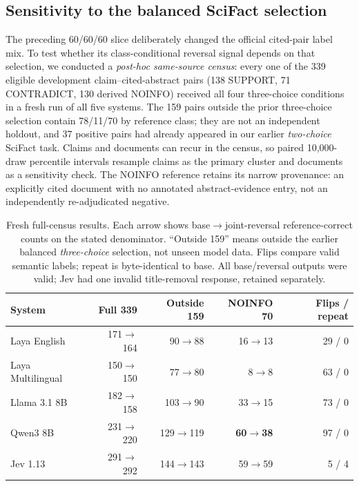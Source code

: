 \subsection{Sensitivity to the balanced SciFact selection}
\label{sec:scifact3-census}
The preceding 60/60/60 slice deliberately changed the official cited-pair label mix. To test whether its class-conditional reversal signal depends on that selection, we conducted a \emph{post-hoc same-source census}: every one of the 339 eligible development claim--cited-abstract pairs (138 SUPPORT, 71 CONTRADICT, 130 derived NOINFO) received all four three-choice conditions in a fresh run of all five systems. The 159 pairs outside the prior three-choice selection contain 78/11/70 by reference class; they are not an independent holdout, and 37 positive pairs had already appeared in our earlier \emph{two-choice} SciFact task. Claims and documents can recur in the census, so paired 10,000-draw percentile intervals resample claims as the primary cluster and documents as a sensitivity check. The NOINFO reference retains its narrow provenance: an explicitly cited document with no annotated abstract-evidence entry, not an independently re-adjudicated negative.

\begin{table}[H]
\centering\small
\setlength{\tabcolsep}{4pt}
\begin{tabular}{lrrrr}
\toprule
System & Full 339 & Outside 159 & NOINFO 70 & Flips / repeat \\
\midrule
Laya English & 171$\to$164 & 90$\to$88 & 16$\to$13 & 29 / 0 \\
Laya Multilingual & 150$\to$150 & 77$\to$80 & 8$\to$8 & 63 / 0 \\
Llama 3.1 8B & 182$\to$158 & 103$\to$90 & 33$\to$15 & 73 / 0 \\
Qwen3 8B & 231$\to$220 & 129$\to$119 & \textbf{60$\to$38} & 97 / 0 \\
Jev 1.13 & 291$\to$292 & 144$\to$143 & 59$\to$59 & 5 / 4 \\
\bottomrule
\end{tabular}
\caption{Fresh full-census results. Each arrow shows base$\to$joint-reversal reference-correct counts on the stated denominator. ``Outside 159'' means outside the earlier balanced \emph{three-choice} selection, not unseen model data. Flips compare valid semantic labels; repeat is byte-identical to base. All base/reversal outputs were valid; Jev had one invalid title-removal response, retained separately.}
\label{tab:scifact3-census}
\end{table}

